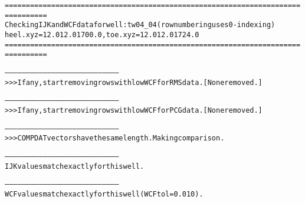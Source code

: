 \begin{alltt}
================================================================================
Checking IJK and WCF data for well: tw04_04 (row numbering uses 0-indexing)
heel.xyz = 12.0 12.0 1700.0, toe.xyz = 12.0 12.0 1724.0
================================================================================

--------------------------------------------------------------------------------
>>> If any, start removing rows with low WCF for RMS data. [None removed.]

--------------------------------------------------------------------------------
>>> If any, start removing rows with low WCF for PCG data. [None removed.]

--------------------------------------------------------------------------------
>>> COMPDAT vectors have the same length. Making comparison.

--------------------------------------------------------------------------------
IJK values match exactly for this well.

--------------------------------------------------------------------------------
WCF values match exactly for this well (WCF tol = 0.010).
\end{alltt}
